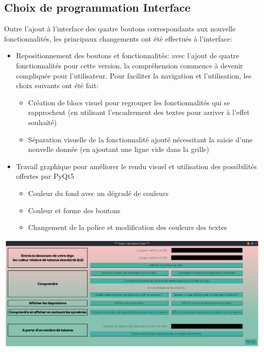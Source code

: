 \subsection{Choix de programmation Interface}

Outre l’ajout à l'interface des quatre boutons correspondants aux nouvelle fonctionnalités, 
les principaux changements ont été effectués à l’interface:

\begin{itemize}
    \item Repositionnement des boutons et fonctionnalités: avec l’ajout de quatre fonctionnalités 
    pour cette version, la compréhension commence à devenir compliquée pour l’utilisateur. 
    Pour faciliter la navigation et l’utilisation, les choix suivants ont été fait:
    \begin{itemize}
        \item Création de blocs visuel pour regrouper les fonctionnalités qui se rapprochent 
        (en utilisant l’encadrement des textes pour arriver à l'effet souhaité)
        \item Séparation visuelle de la fonctionnalité ajouté nécessitant la saisie d’une nouvelle 
        donnée (en ajoutant une ligne vide dans la grille)
    \end{itemize}

    \item Travail graphique pour améliorer le rendu visuel et utilisation des possibilités offertes par PyQt5
    
    \begin{itemize}
        \item  Couleur du fond avec un dégradé de couleurs
        \item Couleur et forme des boutons
        \item Changement de la police et modification des couleurs des textes
    \end{itemize}
\end{itemize}


\begin{center}
    \includegraphics[width=16cm]{images/releaseInterface2.png}
\end{center}

